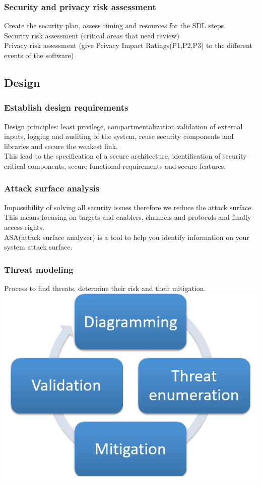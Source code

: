 \documentclass[10pt,a4paper,final]{report}
\begin{document}
\subsubsection{Security and privacy risk assessment}
Create the security plan, assess timing and resources for the SDL steps.\\
Security risk assessment (critical areas that need review)\\
Privacy risk assessment (give Privacy Impact Ratings(P1,P2,P3) to the different events of the software)
\subsection{Design}
\subsubsection{Establish design requirements}
Design principles: least privilege, compartmentalization,validation of external inputs, logging and auditing of the system, reuse security components and libraries and secure the weakest link.\\
This lead to the specification of a secure architecture, identification of security critical components, secure functional requirements and secure features.
\subsubsection{Attack surface analysis} 
Impossibility of solving all security issues therefore we reduce the attack surface. This means focusing on targets and enablers, channels and protocols and finally access rights.\\
ASA(attack surface analyzer) is a tool to help you identify information on your system attack surface.
\subsubsection{Threat modeling}
Process to find threats, determine their risk and their mitigation.\\
\includegraphics[scale=.65]{ThreatModeling.png}
\end{document}
